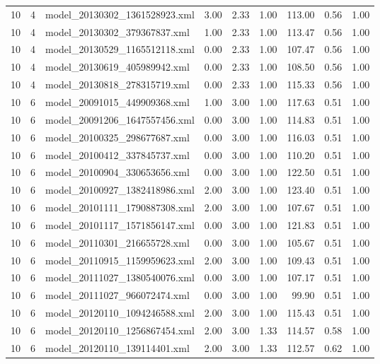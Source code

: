 \begin{table}[ht]
\begin{tabular}{rrlrrrrrr}
   10 &   4 & model\_20130302\_1361528923.xml & 3.00 & 2.33 & 1.00 & 113.00 & 0.56 & 1.00 \\ 
   10 &   4 & model\_20130302\_379367837.xml & 1.00 & 2.33 & 1.00 & 113.47 & 0.56 & 1.00 \\ 
   10 &   4 & model\_20130529\_1165512118.xml & 0.00 & 2.33 & 1.00 & 107.47 & 0.56 & 1.00 \\ 
   10 &   4 & model\_20130619\_405989942.xml & 0.00 & 2.33 & 1.00 & 108.50 & 0.56 & 1.00 \\ 
   10 &   4 & model\_20130818\_278315719.xml & 0.00 & 2.33 & 1.00 & 115.33 & 0.56 & 1.00 \\ 
   10 &   6 & model\_20091015\_449909368.xml & 1.00 & 3.00 & 1.00 & 117.63 & 0.51 & 1.00 \\ 
   10 &   6 & model\_20091206\_1647557456.xml & 0.00 & 3.00 & 1.00 & 114.83 & 0.51 & 1.00 \\ 
   10 &   6 & model\_20100325\_298677687.xml & 0.00 & 3.00 & 1.00 & 116.03 & 0.51 & 1.00 \\ 
   10 &   6 & model\_20100412\_337845737.xml & 0.00 & 3.00 & 1.00 & 110.20 & 0.51 & 1.00 \\ 
   10 &   6 & model\_20100904\_330653656.xml & 0.00 & 3.00 & 1.00 & 122.50 & 0.51 & 1.00 \\ 
   10 &   6 & model\_20100927\_1382418986.xml & 2.00 & 3.00 & 1.00 & 123.40 & 0.51 & 1.00 \\ 
   10 &   6 & model\_20101111\_1790887308.xml & 2.00 & 3.00 & 1.00 & 107.67 & 0.51 & 1.00 \\ 
   10 &   6 & model\_20101117\_1571856147.xml & 0.00 & 3.00 & 1.00 & 121.83 & 0.51 & 1.00 \\ 
   10 &   6 & model\_20110301\_216655728.xml & 0.00 & 3.00 & 1.00 & 105.67 & 0.51 & 1.00 \\ 
   10 &   6 & model\_20110915\_1159959623.xml & 2.00 & 3.00 & 1.00 & 109.43 & 0.51 & 1.00 \\ 
   10 &   6 & model\_20111027\_1380540076.xml & 0.00 & 3.00 & 1.00 & 107.17 & 0.51 & 1.00 \\ 
   10 &   6 & model\_20111027\_966072474.xml & 0.00 & 3.00 & 1.00 & 99.90 & 0.51 & 1.00 \\ 
   10 &   6 & model\_20120110\_1094246588.xml & 2.00 & 3.00 & 1.00 & 115.43 & 0.51 & 1.00 \\ 
   10 &   6 & model\_20120110\_1256867454.xml & 2.00 & 3.00 & 1.33 & 114.57 & 0.58 & 1.00 \\ 
   10 &   6 & model\_20120110\_139114401.xml & 2.00 & 3.00 & 1.33 & 112.57 & 0.62 & 1.00 \\ 

\end{tabular}
\end{table}
